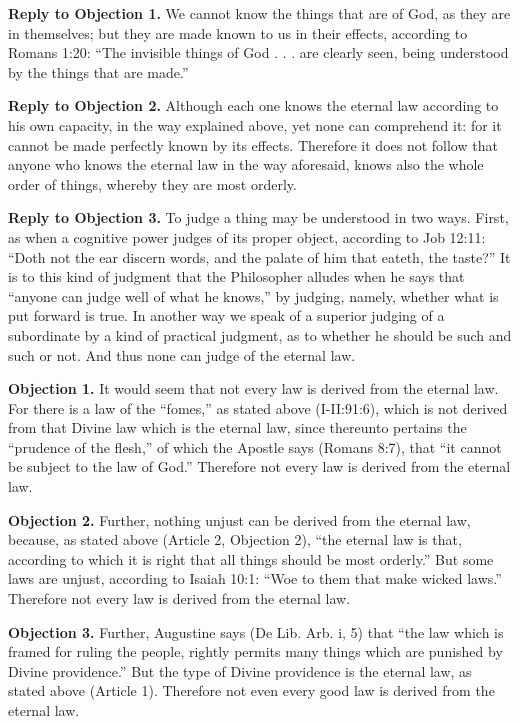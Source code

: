 \textbf{Reply to Objection 1.} We cannot know the things that are of God, as they are in themselves; but they are made known to us in their effects, according to Romans 1:20: ``The invisible things of God . . . are clearly seen, being understood by the things that are made.''

\textbf{Reply to Objection 2.} Although each one knows the eternal law according to his own capacity, in the way explained above, yet none can comprehend it: for it cannot be made perfectly known by its effects. Therefore it does not follow that anyone who knows the eternal law in the way aforesaid, knows also the whole order of things, whereby they are most orderly.

\textbf{Reply to Objection 3.} To judge a thing may be understood in two ways. First, as when a cognitive power judges of its proper object, according to Job 12:11: ``Doth not the ear discern words, and the palate of him that eateth, the taste?'' It is to this kind of judgment that the Philosopher alludes when he says that ``anyone can judge well of what he knows,'' by judging, namely, whether what is put forward is true. In another way we speak of a superior judging of a subordinate by a kind of practical judgment, as to whether he should be such and such or not. And thus none can judge of the eternal law.


\textbf{Objection 1.} It would seem that not every law is derived from the eternal law. For there is a law of the ``fomes,'' as stated above (I-II:91:6), which is not derived from that Divine law which is the eternal law, since thereunto pertains the ``prudence of the flesh,'' of which the Apostle says (Romans 8:7), that ``it cannot be subject to the law of God.'' Therefore not every law is derived from the eternal law.

\textbf{Objection 2.} Further, nothing unjust can be derived from the eternal law, because, as stated above (Article 2, Objection 2), ``the eternal law is that, according to which it is right that all things should be most orderly.'' But some laws are unjust, according to Isaiah 10:1: ``Woe to them that make wicked laws.'' Therefore not every law is derived from the eternal law.

\textbf{Objection 3.} Further, Augustine says (De Lib. Arb. i, 5) that ``the law which is framed for ruling the people, rightly permits many things which are punished by Divine providence.'' But the type of Divine providence is the eternal law, as stated above (Article 1). Therefore not even every good law is derived from the eternal law.

